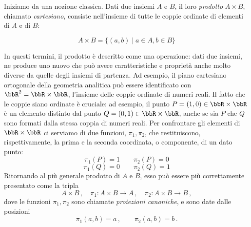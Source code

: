 Iniziamo da una nozione classica.
Dati due insiemi \(A\) e \(B\), il loro \emph{prodotto} \(A\times B\), chiamato \emph{cartesiano}, consiste nell'insieme di tutte le coppie ordinate di elementi di \(A\) e di \(B\):

\[
	A\times B= \{(a,b)\mid a\in A, b\in B\}
\]

In questi termini, il prodotto è descritto come una operazione: dati due insiemi, ne produce uno nuovo che può avere caratteristiche e proprietà anche molto diverse da quelle degli insiemi di partenza. Ad esempio, il piano cartesiano ortogonale della geometria analitica può essere identificato con \(\bbR^2=\bbR\times\bbR\), l'insieme delle coppie ordinate di numeri reali. Il fatto che le coppie siano ordinate è cruciale: ad esempio, il punto \(P=(1,0)\in \bbR\times\bbR\) è un elemento distinto dal punto \(Q=(0,1)\in \bbR\times\bbR\), anche se sia \(P\) che \(Q\) sono formati dalla stessa coppia di numeri reali. Per confrontare gli elementi di \(\bbR\times\bbR\) ci serviamo di due funzioni, \(\pi_1,\pi_2\), che restituiscono, rispettivamente, la prima e la seconda coordinata, o componente, di un dato punto:
\[
	\pi_1(P)=1\qquad \pi_2(P)=0
\]
\[
	\pi_1(Q)=0\qquad \pi_2(Q)=1
\]
Ritornando al più generale prodotto di \(A\) e \(B\), esso può essere più correttamente presentato come la tripla
\[
	A\times B\,,\quad \pi_1\colon A\times B\to A\,,\quad \pi_2\colon A\times B\to B\,,
\]
dove le funzioni \(\pi_1,\pi_2\) sono chiamate \emph{proiezioni canoniche}, e sono date dalle posizioni
\[
	\pi_1(a,b)=a\,,\qquad \pi_2(a,b)=b\,.
\]


